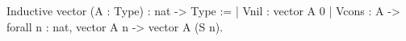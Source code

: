 Inductive vector (A : Type) : nat -> Type :=
| Vnil : vector A 0
| Vcons : A -> forall n : nat, vector A n -> vector A (S n).